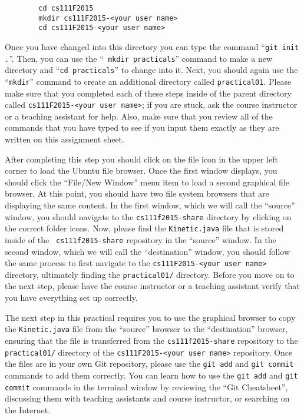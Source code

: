     \begin{verbatim}
        cd cs111F2015
        mkdir cs111F2015-<your user name>
        cd cs111F2015-<your user name>
    \end{verbatim}
    \vspace*{-.2in}


Once you have changed into this directory you can type the command ``{\tt git init .}''. Then, you can use the ``{\tt
mkdir practicals}'' command to make a new directory and ``{\tt cd practicals}'' to change into it.  Next, you should
again use the ``{\tt mkdir}'' command to create an additional directory called {\tt practical01}.  Please make sure that
you completed each of these steps inside of the parent directory called {\tt cs111F2015-<your user name>}; if you are
stuck, ask the course instructor or a teaching assistant for help. Also, make sure that you review all of the commands
that you have typed to see if you input them exactly as they are written on this assignment sheet.

After completing this step you should click on the file icon in the upper left corner to load the Ubuntu file browser.
Once the first window displays, you should click the ``File/New Window'' menu item to load a second graphical file
browser. At this point, you should have two file system browsers that are displaying the same content.  In the first
window, which we will call the ``source'' window, you should navigate to the {\tt cs111f2015-share} directory by
clicking on the correct folder icons.  Now, please find the {\tt Kinetic.java} file that is stored inside of the {\tt
  cs111f2015-share} repository in the ``source'' window. In the second window, which we will call the ``destination''
window, you should follow the same process to first navigate to the {\tt cs111F2015-<your user name>} directory,
ultimately finding the {\tt practical01/} directory. Before you move on to the next step, please have the course instructor
or a teaching assistant verify that you have everything set up correctly.

The next step in this practical requires you to use the graphical browser to copy the {\tt Kinetic.java} file from the
``source'' browser to the ``destination'' browser, ensuring that the file is transferred from the {\tt cs111f2015-share}
repository to the {\tt practical01/} directory of the {\tt cs111F2015-<your user name>} repository.  Once the files are
in your own Git repository, please use the {\tt git add} and {\tt git commit} commands to add them correctly. You can
learn how to use the {\tt git add} and {\tt git commit} commands in the terminal window by reviewing the ``Git
Cheatsheet'', discussing them with teaching assistants and course instructor, or searching on the Internet.


